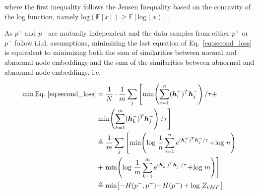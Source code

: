 \noindent where the first inequality follows the Jensen Inequality based on the concavity of the log function, namely $\text{log}(\mathbb{E}[x])\geq \mathbb{E}[\text{log}(x)]$. 

As $p^+$ and $p^-$ are mutually independent and the data samples from either $p^+$ or $p^-$ follow i.i.d. assumptions, minimizing the last equation of Eq.~\eqref{eq:second_loss} is equivalent to minimizing both the sum of similarities between normal and abnormal node
embeddings and the sum of the similarities between abnormal and abnormal node embeddings, i.e.





\begin{small}
\begin{equation}
\label{eq:third_loss}
\begin{split}
\min \text{Eq.}~\eqref{eq:second_loss} &= \frac{1}{N}\cdot \frac{1}{m}\sum_{j}\left[\min\!\left( \sum_{i=1}^{n}(\boldsymbol{h}^+_i)^T\boldsymbol{h}^-_j\right)/\tau + \right. \\
&\left.\min\!\left( \sum_{k=1}^{m}(\boldsymbol{h}^-_k)^T\boldsymbol{h}^-_j\right)/\tau\right]\\
&\triangleq \frac{1}{m}\sum_{j}\left[\min\!\left(\text{log}~\frac{1}{n}\sum_{i=1}^{n}e^{(\boldsymbol{h}^+_i)^T\boldsymbol{h}^-_j/\tau}\! +\! \text{log}~n\right) \right.\\ 
&+\left.\min\!\left(\text{log}~\frac{1}{m}\sum_{k=1}^{m}e^{(\boldsymbol{h}^-_k)^T\boldsymbol{h}^-_j/\tau} \!+\! \text{log}~m\right)\right] \\
\!\!\!\!&\triangleq \min\!\left[-H(p^-, p^+) \!-\!H(p^-)+\text{log}~Z_{vMF}\right]
\end{split}
\end{equation}
\end{small}

